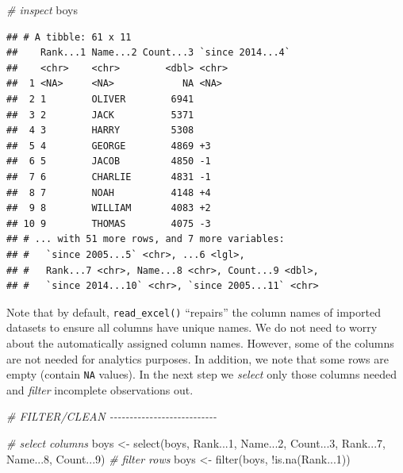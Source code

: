 \documentclass[
  12pt,
]{style/krantz}
\newenvironment{Shaded}{\begin{snugshade}}{\end{snugshade}}
\newcommand{\CommentTok}[1]{\textcolor[rgb]{0.56,0.35,0.01}{\textit{#1}}}
\newcommand{\DecValTok}[1]{\textcolor[rgb]{0.00,0.00,0.81}{#1}}
\newcommand{\FunctionTok}[1]{\textcolor[rgb]{0.00,0.00,0.00}{#1}}
\newcommand{\NormalTok}[1]{#1}
\newcommand{\OtherTok}[1]{\textcolor[rgb]{0.56,0.35,0.01}{#1}}
\newcommand{\SpecialCharTok}[1]{\textcolor[rgb]{0.00,0.00,0.00}{#1}}
\begin{document}
\begin{Shaded}
\begin{Highlighting}[]
\CommentTok{\# inspect}
\NormalTok{boys}
\end{Highlighting}
\end{Shaded}

\begin{verbatim}
## # A tibble: 61 x 11
##    Rank...1 Name...2 Count...3 `since 2014...4`
##    <chr>    <chr>        <dbl> <chr>           
##  1 <NA>     <NA>            NA <NA>            
##  2 1        OLIVER        6941 ­                
##  3 2        JACK          5371 ­                
##  4 3        HARRY         5308 ­                
##  5 4        GEORGE        4869 +3              
##  6 5        JACOB         4850 -1              
##  7 6        CHARLIE       4831 -1              
##  8 7        NOAH          4148 +4              
##  9 8        WILLIAM       4083 +2              
## 10 9        THOMAS        4075 -3              
## # ... with 51 more rows, and 7 more variables:
## #   `since 2005...5` <chr>, ...6 <lgl>,
## #   Rank...7 <chr>, Name...8 <chr>, Count...9 <dbl>,
## #   `since 2014...10` <chr>, `since 2005...11` <chr>
\end{verbatim}

Note that by default, \texttt{read\_excel()} ``repairs'' the column names of imported datasets to ensure all columns have unique names. We do not need to worry about the automatically assigned column names. However, some of the columns are not needed for analytics purposes. In addition, we note that some rows are empty (contain \texttt{NA} values). In the next step we \emph{select} only those columns needed and \emph{filter} incomplete observations out.

\begin{Shaded}
\begin{Highlighting}[]
\CommentTok{\# FILTER/CLEAN {-}{-}{-}{-}{-}{-}{-}{-}{-}{-}{-}{-}{-}{-}{-}{-}{-}{-}{-}{-}{-}{-}{-}{-}{-}{-}{-}}

\CommentTok{\# select columns}
\NormalTok{boys }\OtherTok{\textless{}{-}} \FunctionTok{select}\NormalTok{(boys, Rank...}\DecValTok{1}\NormalTok{, Name...}\DecValTok{2}\NormalTok{, Count...}\DecValTok{3}\NormalTok{, Rank...}\DecValTok{7}\NormalTok{, Name...}\DecValTok{8}\NormalTok{, Count...}\DecValTok{9}\NormalTok{)}
\CommentTok{\# filter rows}
\NormalTok{boys }\OtherTok{\textless{}{-}}  \FunctionTok{filter}\NormalTok{(boys, }\SpecialCharTok{!}\FunctionTok{is.na}\NormalTok{(Rank...}\DecValTok{1}\NormalTok{))}
\end{Highlighting}
\end{Shaded}
\end{document}

